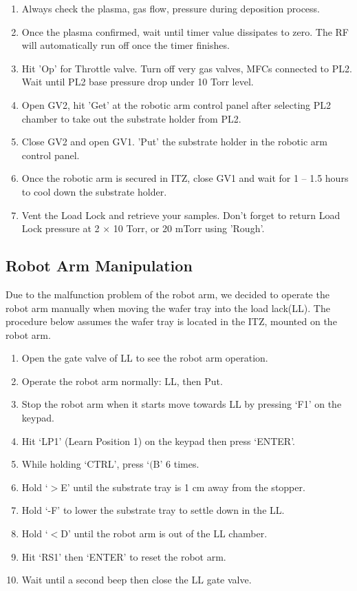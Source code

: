 \begin{enumerate}
  \item Always check the plasma, gas flow, pressure during deposition process.
  \item Once the plasma confirmed, wait until timer value dissipates to zero. The RF will automatically run off once the timer finishes. 
  \item Hit 'Op' for Throttle valve. Turn off very gas valves, MFCs connected to PL2. Wait until PL2 base pressure drop under 10 Torr level.
  \item Open GV2, hit 'Get' at the robotic arm control panel after selecting PL2 chamber to take out the substrate holder from PL2. 
  \item Close GV2 and open GV1. 'Put' the substrate holder in the robotic arm control panel.
  \item Once the robotic arm is secured in ITZ, close GV1 and wait for 1 -- 1.5 hours to cool down the substrate holder.
  \item Vent the Load Lock and retrieve your samples. Don't forget to return Load Lock pressure at 2 $\times$ 10 Torr, or 20 mTorr using 'Rough'.
\end{enumerate}

\subsection{Robot Arm Manipulation}
Due to the malfunction problem of the robot arm, we decided to operate the robot arm manually when moving the wafer tray into the load lack(LL). The procedure below assumes the wafer tray is located in the ITZ, mounted on the robot arm.
	\begin{enumerate}
		\item Open the gate valve of LL to see the robot arm operation.
		\item Operate the robot arm normally: LL, then Put.
		\item Stop the robot arm when it starts move towards LL by pressing `F1' on the keypad.
		\item Hit `LP1' (Learn Position 1) on the keypad then press `ENTER'.
		\item While holding `CTRL', press `$($B' 6 times.
		\item Hold `$>$E' until the substrate tray is 1 cm away from the stopper.
		\item Hold `-F' to lower the substrate tray to settle down in the LL.
		\item Hold `$<$D' until the robot arm is out of the LL chamber.
		\item Hit `RS1' then `ENTER' to reset the robot arm.
		\item Wait until a second beep then close the LL gate valve.
	\end{enumerate}

